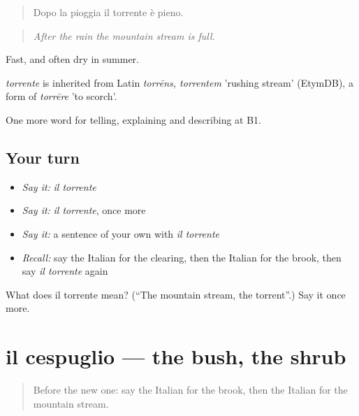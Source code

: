 \begin{quote}
Dopo la pioggia il torrente è pieno.
\end{quote}

\begin{quote}
\emph{After the rain the mountain stream is full.}
\end{quote}

Fast, and often dry in summer.

\begin{cousinweb}
\emph{torrente} is inherited from Latin \emph{torrēns, torrentem} 'rushing stream' (EtymDB), a form of \emph{torrēre} 'to scorch'.
\end{cousinweb}

\begin{grammarlens}[title={What you've built}]
One more word for telling, explaining and describing at B1.
\end{grammarlens}

\subsection*{Your turn}
\begin{itemize}
\raggedright
  \item \emph{Say it:} \emph{il torrente}
  \item \emph{Say it:} \emph{il torrente}, once more
  \item \emph{Say it:} a sentence of your own with \emph{il torrente}
  \item \emph{Recall:} say the Italian for the clearing, then the Italian for the brook, then say \emph{il torrente} again
\end{itemize}

\begin{tcolorbox}[breakable,colback=teal!4,colframe=teal!35!black,title={Before you move on}]
What does il torrente mean? (\textquotedblleft{}The mountain stream, the torrent\textquotedblright{}.) Say it once more.
\end{tcolorbox}
\section[il cespuglio]{il cespuglio — the bush, the shrub}

\label{lesson:IT-C460-cespuglio}



\begin{quote}
Before the new one: say the Italian for the brook, then the Italian for the mountain stream.
\end{quote}

